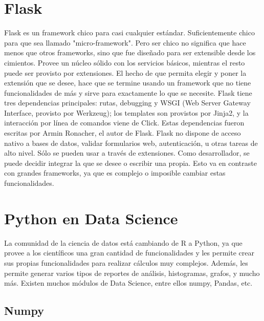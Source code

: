 \section[Flask]{Flask}

Flask es un framework chico para casi cualquier estándar. Suficientemente chico para que sea llamado "micro-framework"\cite{Fsck}. Pero ser chico no significa que hace menos que otros frameworks, sino que fue diseñado para ser extensible desde los cimientos. Provee un núcleo sólido con los servicios básicos, mientras el resto puede ser provisto por extensiones. El hecho de que permita elegir y poner la extensión que se desee, hace que se termine usando un framework que no tiene funcionalidades de más y sirve para exactamente lo que se necesite.
Flask tiene tres dependencias principales: rutas, debugging y WSGI (Web Server Gateway Interface, provisto por Werkzeug); los templates son provistos por Jinja2, y la interacción por línea de comandos viene de Click. Estas dependencias fueron escritas por Armin Ronacher, el autor de Flask.
Flask no dispone de acceso nativo a bases de datos, validar formularios web, autenticación, u otras tareas de alto nivel. Sólo se pueden usar a través de extensiones. Como desarrollador, se puede decidir integrar la que se desee o escribir una propia. Esto va en contraste con grandes frameworks, ya que es complejo o imposible cambiar estas funcionalidades.

\section[Python en Data Science]{Python en Data Science}

La comunidad de la ciencia de datos está cambiando de R a Python, ya que provee a los científicos una gran cantidad de funcionalidades y les permite crear sus propias funcionalidades para realizar cálculos muy complejos. Además, les permite generar varios tipos de reportes de análisis, histogramas, grafos, y mucho más.
Existen muchos módulos de Data Science, entre ellos numpy, Pandas, etc.

\subsection[Numpy]{Numpy}

